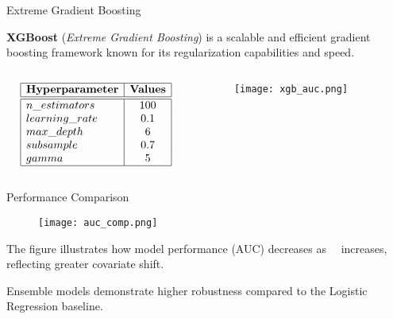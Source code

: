 \begin{frame}{Extreme Gradient Boosting}

    \textbf{XGBoost} (\textit{Extreme Gradient Boosting}) is a scalable and efficient gradient boosting framework known for its regularization capabilities and speed.

    \vspace{-1em}

    \begin{columns}
        \begin{column}{0.45\textwidth}
            {\small
            $$
            \begin{array}{|l|c|}
                \hline
                \textbf{Hyperparameter} & \textbf{Values} \\
                \hline
                \hline
                n\_estimators & 100 \\
                learning\_rate & 0.1 \\
                max\_depth & 6 \\
                subsample & 0.7 \\
                gamma & 5 \\
                \hline
            \end{array}
            $$
            }
        \end{column}
        \begin{column}{0.55\textwidth}
            \begin{figure}
                \centering
                \vfill
                \texttt{[image: xgb\_auc.png]}
            \end{figure}
        \end{column}
    \end{columns}
\end{frame}

\begin{frame}{Performance Comparison}

    \begin{figure}
        \centering
        \vfill
        \texttt{[image: auc\_comp.png]}
    \end{figure}

    \small

    The figure illustrates how model performance (AUC) decreases as \ \alpha \ increases, reflecting greater covariate shift.

    Ensemble models demonstrate higher robustness compared to the Logistic Regression baseline.

\end{frame}

